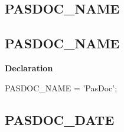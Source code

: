 \documentclass{report}
\newif\ifpdf
\begin{document}
\subsection*{\large{\textbf{PASDOC{\_}NAME}}\normalsize\hspace{1ex}\hrulefill}
\else
\subsection*{PASDOC{\_}NAME}
\fi
\label{PasDoc_Versions-PASDOC_NAME}
\begin{list}{}{
\setlength{\itemindent}{0cm}
\setlength{\listparindent}{0cm}
\setlength{\leftmargin}{\evensidemargin}
\addtolength{\leftmargin}{\tmplength}
\settowidth{\labelsep}{X}
\addtolength{\leftmargin}{\labelsep}
\setlength{\labelwidth}{\tmplength}
}
\item[\textbf{Declaration}\hfill]
\ifpdf
\begin{flushleft}
\fi
\begin{ttfamily}
PASDOC{\_}NAME = 'PasDoc';\end{ttfamily}

\ifpdf
\end{flushleft}
\fi

\end{list}
\ifpdf
\subsection*{\large{\textbf{PASDOC{\_}DATE}}\normalsize\hspace{1ex}\hrulefill}
\else
\end{document}
